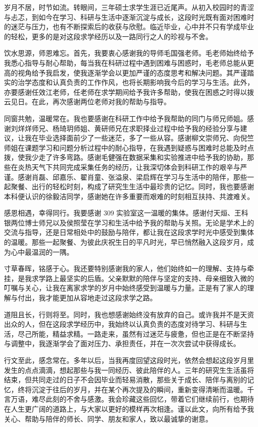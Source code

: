 
岁月不居，时节如流。转眼间，三年硕士求学生涯已近尾声。从初入校园时的青涩与忐忑，到如今在学习、科研与生活中逐渐沉淀与成长，这段时光既有面对困难时的迷茫与压力，也有不断探索后的收获与欣慰。临近毕业，心中并不只有学成毕业的轻松，更多的是对这段求学经历以及一路同行之人的珍视与不舍。

饮水思源，师恩难忘。首先，我要衷心感谢我的导师毛国强老师。毛老师始终给予我悉心指导与耐心帮助，每当我在科研过程中遇到困难与困惑时，毛老师总能从更高的视角给予我启发，使我逐渐学会以更加严谨的态度思考和解决问题。其严谨踏实的治学态度和认真负责的工作作风，也将长期影响我今后的学习与生活。此外，亦要感谢任效江老师，任老师在求学期间给予我许多帮助，使我在困惑之时得以拨云见日。在此，再次感谢两位老师对我的帮助与指导。

同窗共勉，温暖常在。我也要感谢在科研工作中给予我帮助的同门与师兄师姐。感谢刘烊烊师兄、杨琦玥师姐、黄研师兄在求职择业过程中给予我的经验分享与建议，让我在毕业选择面前少了一些迷茫，多了一些从容。感谢柳文崇师兄、向倪竺师姐在课题学习和问题分析过程中的耐心指导，在我遇到疑惑与困难时总能及时点拨，使我少走了许多弯路。感谢毛健强在数据采集和实验推进中给予我的协助，那些在炎热天气下共同完成采集任务的经历，让我深切体会到科研工作的艰辛与严谨。感谢肖磊、邱嘉乐、翟肖童、张溢泉、梁启辉在学习与生活中的陪伴，那些一起聚餐、出行的轻松时刻，构成了研究生生活中最珍贵的记忆。同时，我也要感谢本科便认识的徐毅洁同学，感谢她在许多重要而艰难的时刻相互扶持、共渡难关。

感恩相遇，幸得同行。我要感谢 309 实验室这一温暖的集体。感谢付天烜、王科银两位博士师兄以及侯照莹在学习和生活中给予我的帮助与关照。无论是学术上的交流与指导，还是日常相处中的鼓励与陪伴，都让我在这段求学时光中感受到集体的温暖。那些一起聚餐、为彼此庆祝生日的平凡时光，早已悄然融入这段岁月，成为心中最温润的一隅。

寸草春晖，铭感于心。我还要特别感谢我的家人，他们始终如一的理解、支持与牵挂，是我求学路上最坚实的后盾。父亲默默的陪伴与坚定的支持、母亲细致入微的叮嘱与关心，让我在离家求学的岁月中始终感受到温暖与力量。正是有了家人的理解与付出，我才能更加从容地走过这段求学之路。

道阻且长，行则将至。同时，我也想感谢始终没有放弃的自己。或许我并不是天资出众的人，但在这段求学经历中，我始终以认真负责的态度对待学习、科研与生活，尽己所能，精益求精。一路走来，虽然有过迷茫与疲惫，但也正是在不断坚持与调整中，我逐渐学会了面对压力、承担责任，并在一次次尝试中获得成长。

行文至此，感念常在。多年以后，当我再度回望这段时光，依然会想起这段岁月里发生的点点滴滴，想起那些与我一同经历、彼此陪伴的人。三年的研究生生活虽将结束，但共同走过的日子不会因毕业而轻易消散，那些关于成长、陪伴与离别的记忆，终将沉淀于往后的岁月，并在某个再次提及的瞬间，重新变得清晰而温暖。千言万语，难尽此刻的不舍与感激。我会珍藏这些回忆，带着它们继续前行，也期待在人生更广阔的道路上，与大家以更好的模样再次相逢。谨以此文，向所有给予我关心、帮助与陪伴的师长、同学、朋友和家人，致以最诚挚的谢意。

